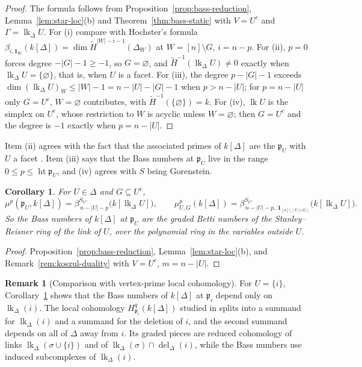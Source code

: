 \documentclass[11pt]{article}
\theoremstyle{plain}
\newtheorem{corollary}[theorem]{Corollary}
\theoremstyle{definition}
\newtheorem{remark}[theorem]{Remark}
\newcommand{\kk}{k}
\newcommand{\pp}{\mathfrak{p}}
\newcommand{\link}{\operatorname{lk}}
\newcommand{\rH}{\widetilde{H}}
\newcommand{\Hloc}[2]{H^{#1}_{#2}}
\newcommand{\one}{\mathbf 1}
\begin{document}
\begin{proof}
The formula follows from Proposition~\ref{prop:bass-reduction}, Lemma~\ref{lem:star-loc}(b) and
Theorem~\ref{thm:bass-static} with $V=U^c$ and $\Gamma=\link_\Delta U$. For (i) compare with Hochster's
formula $\beta_{i,\one_W}(\kk[\Delta])=\dim\rH^{|W|-i-1}(\Delta_W)$ at $W=[n]\setminus G$, $i=n-p$.
For (ii), $p=0$ forces degree $-|G|-1\ge-1$, so $G=\varnothing$, and $\rH^{-1}(\link_\Delta U)\ne0$ exactly
when $\link_\Delta U=\{\varnothing\}$, that is, when $U$ is a facet. For (iii), the degree $p-|G|-1$ exceeds
$\dim(\link_\Delta U)_W\le|W|-1=n-|U|-|G|-1$ when $p>n-|U|$; for $p=n-|U|$ only $G=U^c$, $W=\varnothing$
contributes, with $\rH^{-1}(\{\varnothing\})=\kk$. For (iv), $\link U$ is the simplex on $U^c$, whose restriction
to $W$ is acyclic unless $W=\varnothing$; then $G=U^c$ and the degree is $-1$ exactly when $p=n-|U|$.
\end{proof}

Item (ii) agrees with the fact that the associated primes of $\kk[\Delta]$ are the $\pp_U$ with $U$ a facet
\cite[\S5.1]{BrunsHerzog}. Item (iii) says that the Bass numbers at $\pp_U$ live in the range
$0\le p\le\operatorname{ht}\pp_U$, and (iv) agrees with $S$ being Gorenstein.

\begin{corollary}\label{cor:bass-betti-link}
For $U\in\Delta$ and $G\subseteq U^c$,
\[
\mu^p(\pp_U,\kk[\Delta])=\beta^{S_{U^c}}_{\,n-|U|-p}\bigl(\kk[\link_\Delta U]\bigr),\qquad
\mu^p_{U,G}(\kk[\Delta])=\beta^{S_{U^c}}_{\,n-|U|-p,\ \one_{[n]\setminus(U\cup G)}}\bigl(\kk[\link_\Delta U]\bigr).
\]
So the Bass numbers of $\kk[\Delta]$ at $\pp_U$ are the graded Betti numbers of the Stanley--Reisner ring of the
link of $U$, over the polynomial ring in the variables outside $U$.
\end{corollary}

\begin{proof}
Proposition~\ref{prop:bass-reduction}, Lemma~\ref{lem:star-loc}(b), and Remark~\ref{rem:koszul-duality} with
$V=U^c$, $m=n-|U|$.
\end{proof}

\begin{remark}[Comparison with vertex-prime local cohomology]\label{rem:vertex-prime}
For $U=\{i\}$, Corollary~\ref{cor:bass-betti-link} shows that the Bass numbers of $\kk[\Delta]$ at $\pp_i$
depend only on $\link_\Delta(i)$. The local cohomology $\Hloc{q}{\pp_i}(\kk[\Delta])$ studied in
\cite{HeSuwayyidWei} splits into a summand for $\link_\Delta(i)$ and a summand for the deletion of $i$, and
the second summand depends on all of $\Delta$ away from $i$. Its graded pieces are reduced cohomology of
links $\link_\Delta(\sigma\cup\{i\})$ and of $\link_\Delta(\sigma)\cap\operatorname{del}_\Delta(i)$, while the
Bass numbers use induced subcomplexes of $\link_\Delta(i)$.
\end{remark}
\end{document}
